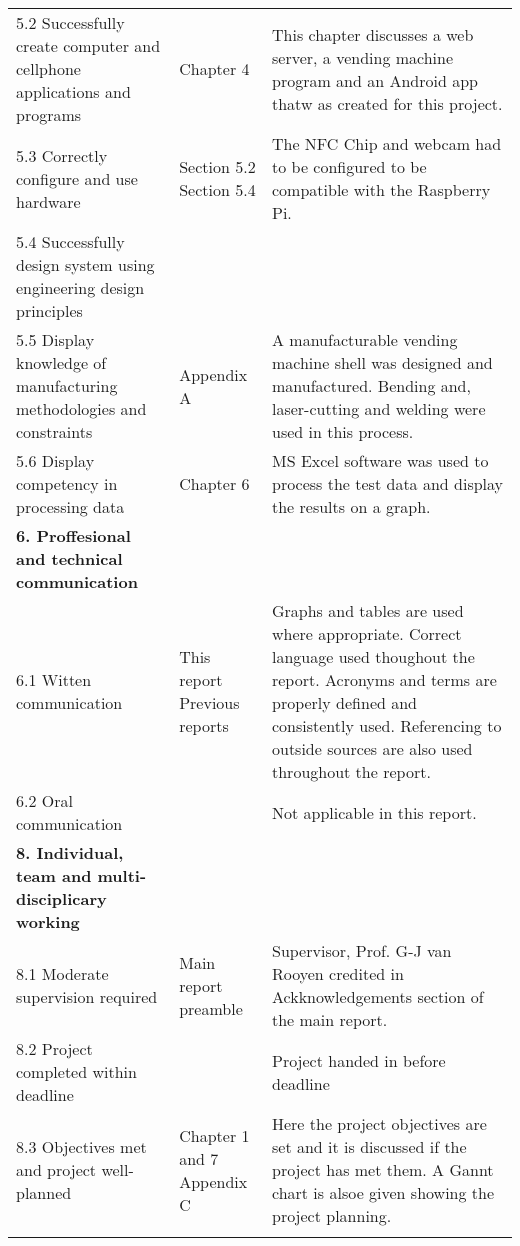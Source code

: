 \begin{longtable}{|p{5.9cm}|p{2.2cm}|p{5.5cm}|}
5.2 Successfully create computer and cellphone applications and programs &  Chapter 4 & This chapter discusses a web server, a vending machine program and an Android app thatw as created for this project.  \\

5.3 Correctly configure and use hardware & Section 5.2
Section 5.4 & The NFC Chip and webcam had to be configured to be compatible with the Raspberry Pi.  \\
\hline
5.4 Successfully design system using engineering design principles &            &            \\

5.5 Display knowledge of manufacturing methodologies and constraints & Appendix A & A manufacturable vending machine shell was designed and manufactured. Bending and, laser-cutting and welding were used in this process. \\

5.6 Display competency in processing data &  Chapter 6 & MS Excel software was used to process the test data and display the results on a graph.  \\
\hline
{\bf 6. Proffesional and technical communication} &            &            \\
6.1 Witten communication & This report
Previous reports & Graphs and tables are used where appropriate. Correct language used thoughout the report. Acronyms and terms are properly defined and consistently used. Referencing to outside sources are also used throughout the report.  \\

6.2 Oral communication &            & Not applicable in this report. \\
\hline

{\bf 8. Individual, team and multi-disciplicary working} & &\\

8.1 Moderate supervision required & Main report preamble & Supervisor, Prof. G-J
van Rooyen credited in Ackknowledgements section of the main report. \\

8.2 Project completed within deadline & & Project handed in before deadline \\

8.3 Objectives met and project well-planned & Chapter 1 and 7
Appendix C & Here the project objectives are set and it is discussed if the
project has met them. A Gannt chart is alsoe given showing the project planning.
\\\hline\newpage\hline


\end{longtable}
